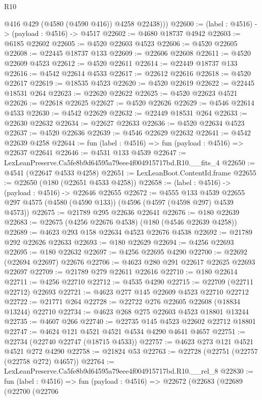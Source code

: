 \begin{lexlean}{R10}
\begin{coremodule}
          @416
          @429
          (@4580 (@4590 @416))
          @4258
          @22438)))
@22600 := (label : @4516) -> (payload : @4516) -> @4517
@22602 := @4680 @18737 @4942
@22603 := @6185 @22602
@22605 := @4520 @22603 @4523
@22606 := @4520 @22605
@22608 := @22445 @18737 @133
@22609 := @22606 @22608
@22611 := @4520 @22609 @4523
@22612 := @4520 @22611
@22614 := @22449 @18737 @133
@22616 := @4542 @22614 @4533
@22617 := @22612 @22616
@22618 := @4520 @22617
@22619 := @18535 @4523
@22620 := @4520 @22619
@22622 := @22445 @18531 @264
@22623 := @22620 @22622
@22625 := @4520 @22623 @4521
@22626 := @22618 @22625
@22627 := @4520 @22626
@22629 := @4546 @22614 @4533
@22630 := @4542 @22629
@22632 := @22449 @18531 @264
@22633 := @22630 @22632
@22634 := @22627 @22633
@22636 := @4520 @22634 @4523
@22637 := @4520 @22636
@22639 := @4546 @22629 @22632
@22641 := @4542 @22639 @4258
@22644 := fun (label : @4516) => fun (payload : @4516) => @22637 @22641
@22646 := @4531 @133 @4539
@22647 := LexLeanPreserve.Ca5fe8b9d64595a79eee4f004915717bd.R10.__fits_4
@22650 := @4541 (@22647 @4533 @4258)
@22651 := LexLeanBoot.ContentId.frame
@22655 := @22650 (@180 (@22651 @4533 @4258))
@22658 := (label : @4516) -> (payload : @4516) -> @22646 @22655
@22672 := @4555
    @133
    @4539
    @22655
    @297
    @4575
    (@4580 (@4590 @133))
    (@4596 (@4597 (@4598 @297) @4539 @4573))
@22675 := @21789 @295 @22636 @22641
@22676 := @180 @22639
@22683 := @22675 (@4256 @22676 @4538) (@180 (@4546 @22639 @4258))
@22689 := @4623 @293 @158 @22634 @4523 @22676 @4538
@22692 := @21789 @292 @22626 @22633
@22693 := @180 @22629
@22694 := @4256 @22693
@22695 := @180 @22632
@22697 := @4256 @22695 @4290
@22700 := @22692 (@22694 @22697) @22676
@22706 := @4623 @280 @291 @22617 @22625 @22693 @22697
@22709 := @21789 @279 @22611 @22616
@22710 := @180 @22614
@22711 := @4256 @22710
@22712 := @4535 @4290
@22715 := @22709 (@22711 @22712) @22693
@22721 := @4623 @277 @145 @22609 @4523 @22710 @22712
@22722 := @21771 @264
@22728 := @22722 @276 @22605 @22608 (@18834 @13244) @22710
@22734 := @4623 @268 @275 @22603 @4523 @18801 @13244
@22735 := @4607 @266
@22740 := @22735 @145 @4523 @22602 @22712 @18801
@22747 := @4624 @121 @4521 @4521 @4534 @4290 @4641 @4657
@22751 := @22734 (@22740 @22747 (@18715 @4533))
@22757 := @4623 @273 @121 @4521 @4521 @272 @4290
@22758 := @21824 @53
@22763 := @22728 (@22751 (@22757 (@22758 @272) @4657))
@22764 := LexLeanPreserve.Ca5fe8b9d64595a79eee4f004915717bd.R10.__rel_8
@22830 := fun (label : @4516) =>
  fun (payload : @4516) =>
  @22672
    (@22683
      (@22689
        (@22700
          (@22706

\end{coremodule}
\end{lexlean}

